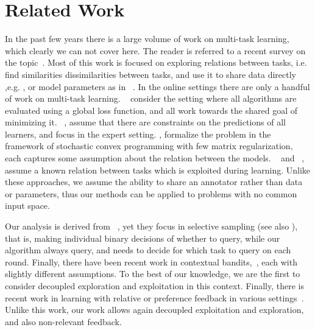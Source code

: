 \chapter{Related Work}

In the past few years there is a large volume of work on multi-task learning, which clearly we can not 
cover here. The reader is referred to a recent survey on the topic~\cite{10.1109/TKDE.2009.191}. 
Most of this work is focused on exploring relations between tasks, i.e. %
find similarities dissimilarities  between tasks, and use it to share data directly ,e.g. 
\cite{NIPS2012_0706}, or model parameters as in ~\cite{Evgeniou:2004:RML:1014052.1014067,Daume:2010:FES:1870526.1870534,DBLP:journals/ml/ArgyriouEP08}. 
In the online settings there are only a handful of work on multi-task learning. 
~\cite{DBLP:conf/colt/DekelLS06} consider the setting where all algorithms are evaluated using a 
global loss function, and all work towards the shared goal of minimizing it. 
~\cite{DBLP:conf/colt/LugosiPS09}, assume that there are constraints on the predictions of all 
learners, and focus in the expert setting. \cite{Agarwal:EECS-2008-138}, formalize the 
problem in the framework of stochastic convex programming with few matrix regularization, each 
captures some assumption about the relation between the models. 
~\cite{DBLP:journals/jmlr/CavallantiCG10} and ~\cite{cesa2006incremental}, 
assume a known relation between tasks which is exploited during learning. 
Unlike these approaches, we assume the ability to share an annotator rather than data or parameters, 
thus our methods can be applied to problems with no common input space.

Our analysis is derived from ~\cite{cesa2006worst}, yet they focus in selective 
sampling (see also \cite{cesa2009robust,dekel2010robust}), that is, making individual binary decisions of 
whether to query, while our algorithm always query, and needs to decide for which task to query on each 
round.
%
Finally, there have been recent work in contextual bandits,~\cite{kakade2008efficient,
hazan2011newtron,DBLP:journals/ml/CrammerG13}, each with slightly different assumptions. 
To the best of our knowledge, we are the first to consider decoupled exploration and exploitation in this 
context. Finally, there is recent work in learning with relative or preference feedback in various 
settings~\cite{DBLP:conf/colt/YueBKJ09,DBLP:journals/jcss/YueBKJ12,DBLP:conf/icml/YueJ11,DBLP:journals/corr/abs-1111-0712}. 
Unlike this work, our work allows again decoupled exploitation and exploration, 
and also non-relevant feedback.


